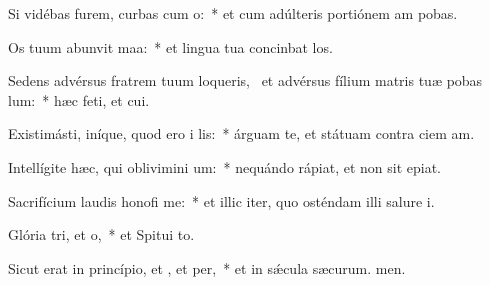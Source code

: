 \item Si vidébas furem, curbas cum o:~* et cum adúlteris portiónem am pobas.
\item Os tuum abunvit maa:~* et lingua tua concinbat los.
\item Sedens advérsus fratrem tuum loqueris,~\pscross{} et advérsus fílium matris tuæ pobas lum:~* hæc feti, et cui.
\item Existimásti, iníque, quod ero i lis:~* árguam te, et státuam contra ciem am.
\item Intellígite hæc, qui oblivimini um:~* nequándo rápiat, et non sit  epiat.
\item Sacrifícium laudis honofi me:~* et illic iter, quo osténdam illi salure i.
\item Glória tri, et o,~* et Spitui to.
\item Sicut erat in princípio, et , et per,~* et in sǽcula sæcurum. men.
